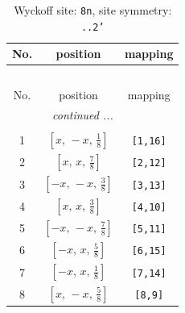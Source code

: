 \documentclass[fleqn,8pt]{jsarticle}
\begin{document}
\begin{longtable}{ccc}
\caption{Wyckoff site: {\tt 8n}, site symmetry: {\tt ..2'}}
 \\
 \hline \hline
No. & position & mapping \\ \hline \endfirsthead

\multicolumn{2}{l}{\tablename\ \thetable{}} \\
 \hline \hline
No. & position & mapping \\ \hline \endhead

 \hline \hline
\multicolumn{2}{r}{\footnotesize\it continued ...} \\ \endfoot

 \hline \hline
\multicolumn{2}{r}{} \\ \endlastfoot

1 & $\left[ x,\, - x,\, \frac{1}{8} \right]$ & {\tt [1,16]} \\ \hline
2 & $\left[ x,\, x,\, \frac{7}{8} \right]$ & {\tt [2,12]} \\ \hline
3 & $\left[ - x,\, - x,\, \frac{3}{8} \right]$ & {\tt [3,13]} \\ \hline
4 & $\left[ x,\, x,\, \frac{3}{8} \right]$ & {\tt [4,10]} \\ \hline
5 & $\left[ - x,\, - x,\, \frac{7}{8} \right]$ & {\tt [5,11]} \\ \hline
6 & $\left[ - x,\, x,\, \frac{5}{8} \right]$ & {\tt [6,15]} \\ \hline
7 & $\left[ - x,\, x,\, \frac{1}{8} \right]$ & {\tt [7,14]} \\ \hline
8 & $\left[ x,\, - x,\, \frac{5}{8} \right]$ & {\tt [8,9]} \\
\end{longtable}
\renewcommand{\arraystretch}{1.2}
\end{document}
